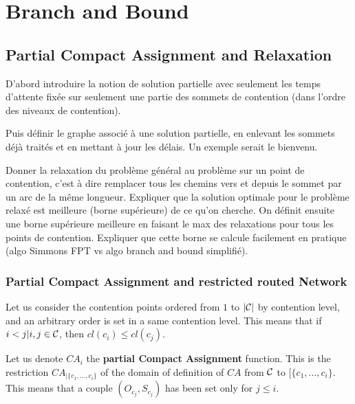  

\section{Branch and Bound}

\subsection{Partial Compact Assignment and Relaxation}

D'abord introduire la notion de solution partielle avec seulement les temps d'attente fixée
sur seulement une partie des sommets de contention (dans l'ordre des niveaux de contention).

Puis définir le graphe associé à une solution partielle, en enlevant les sommets déjà traités 
et en mettant à jour les délais. Un exemple serait le bienvenu.

Donner la relaxation du problème général au problème sur un point de contention, 
c'est à dire remplacer tous les chemins vers et depuis le sommet par un arc de la même longueur.
Expliquer que la solution optimale pour le problème relaxé est meilleure (borne supérieure) de
ce qu'on cherche. On définit ensuite une borne supérieure meilleure en faisant le max des 
relaxations pour tous les points de contention. Expliquer que cette borne se calcule facilement
en pratique (algo Simmons FPT vs algo branch and bound simplifié).
\subsubsection{Partial Compact Assignment and restricted routed Network}

Let us consider the contention points ordered from $1$ to $|{\cal C}|$ by contention level, and an arbitrary order is set in a same contention level. This means that if $i < j | i,j\in{\cal C}$, then  $cl(c_i) \leq cl(c_j)$. 


Let us denote $CA_i$ the \textbf{partial Compact Assignment} function. This is the restriction $CA_{|\{c_1,\ldots,c_i\}}$  of the domain of definition of $CA$ from ${\cal C}$ to $[\{c_1,\ldots,c_i\}$. This means that a couple $(O_{c_j},S_{c_j})$ has been set only for $j \leq i$.

